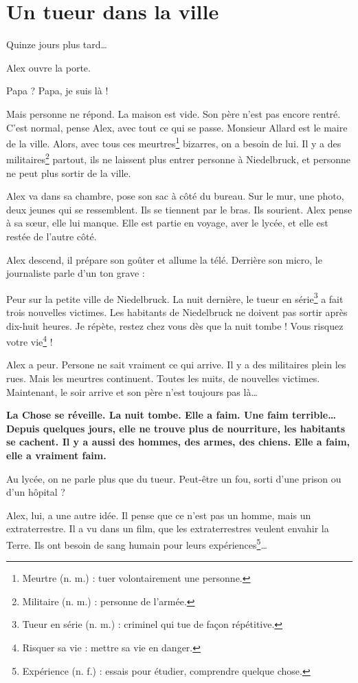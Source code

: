 \chapter{Un tueur dans la ville}
Quinze jours plus tard\ldots{}

Alex ouvre la porte.

\og Papa ? Papa, je suis là ! \fg{}

Mais personne ne répond. La maison est vide. Son père n'est pas encore rentré. C'est normal, pense Alex, avec tout ce qui se
passe. Monsieur Allard est le maire de la ville. Alors, avec tous ces meurtres\footnote{Meurtre (n. m.) : tuer volontairement une
personne.} bizarres, on a besoin de lui. Il y a des militaires\footnote{Militaire (n. m.) : personne de l'armée.} partout, ils ne
laissent plus entrer personne à Niedelbruck, et personne ne peut plus sortir de la ville.

Alex va dans sa chambre, pose son sac à côté du bureau. Sur le mur, une photo, deux jeunes qui se ressemblent. Ils se tiennent par
le bras. Ils sourient. Alex pense à sa s\oe{}ur, elle lui manque. Elle est partie en voyage, aver le lycée, et elle est restée de
l'autre côté.

Alex descend, il prépare son goûter et allume la télé. Derrière son micro, le journaliste parle d'un ton grave :

\og Peur sur la petite ville de Niedelbruck. La nuit dernière, le tueur en série\footnote{Tueur en série (n. m.) : criminel qui tue
de fa\c{c}on répétitive.} a fait trois nouvelles victimes. Les habitants de Niedelbruck ne doivent pas sortir après dix-huit
heures. Je répète, restez chez vous dès que la nuit tombe ! Vous risquez votre vie\footnote{Risquer sa vie : mettre sa vie en
danger.} ! \fg{}

Alex a peur. Persone ne sait vraiment ce qui arrive. Il y a des militaires plein les rues. Mais les meurtres continuent. Toutes
les nuits, de nouvelles victimes. Maintenant, le soir arrive et son père n'est toujours pas là\ldots{}

\textbf{La Chose se réveille. La nuit tombe. Elle a faim. Une faim terrible\ldots{} Depuis quelques jours, elle ne trouve plus de
nourriture, les habitants se cachent. Il y a aussi des hommes, des armes, des chiens. Elle a faim, elle a vraiment faim.}

Au lycée, on ne parle plus que du tueur. Peut-être un fou, sorti d'une prison ou d'un hôpital ?

Alex, lui, a une autre idée. Il pense que ce n'est pas un homme, mais un extraterrestre. Il a vu dans un film, que les
extraterrestres veulent envahir la Terre. Ils ont besoin de sang humain pour leurs expériences\footnote{Expérience (n. f.) :
essais pour étudier, comprendre quelque chose.}\ldots{}

